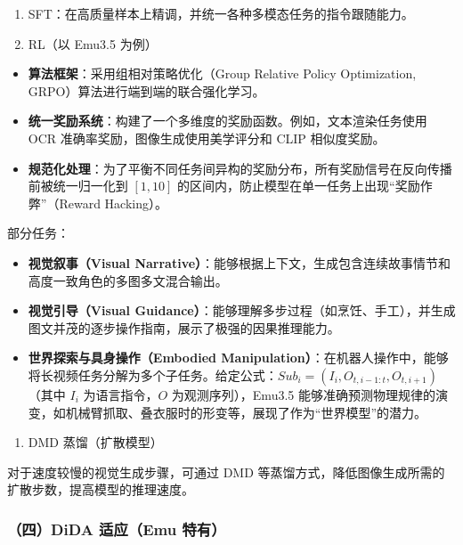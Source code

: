 \begin{enumerate}
\def\labelenumi{\arabic{enumi}.}
\item
  SFT：在高质量样本上精调，并统一各种多模态任务的指令跟随能力。
\item
  RL（以 Emu3.5 为例）
\end{enumerate}

\begin{itemize}
\tightlist
\item
  \textbf{算法框架}：采用组相对策略优化（Group Relative Policy Optimization, GRPO）算法进行端到端的联合强化学习。
\item
  \textbf{统一奖励系统}：构建了一个多维度的奖励函数。例如，文本渲染任务使用 OCR 准确率奖励，图像生成使用美学评分和 CLIP 相似度奖励。
\item
  \textbf{规范化处理}：为了平衡不同任务间异构的奖励分布，所有奖励信号在反向传播前被统一归一化到 \([1,10]\) 的区间内，防止模型在单一任务上出现``奖励作弊''（Reward Hacking）。
\end{itemize}

部分任务：

\begin{itemize}
\tightlist
\item
  \textbf{视觉叙事（Visual Narrative）}：能够根据上下文，生成包含连续故事情节和高度一致角色的多图多文混合输出。
\item
  \textbf{视觉引导（Visual Guidance）}：能够理解多步过程（如烹饪、手工），并生成图文并茂的逐步操作指南，展示了极强的因果推理能力。
\item
  \textbf{世界探索与具身操作（Embodied Manipulation）}：在机器人操作中，能够将长视频任务分解为多个子任务。给定公式：\(Sub_i=(I_i,O_{t,i-1:t},O_{t,i+1})\)（其中 \(I_i\) 为语言指令，\(O\) 为观测序列），Emu3.5 能够准确预测物理规律的演变，如机械臂抓取、叠衣服时的形变等，展现了作为``世界模型''的潜力。
\end{itemize}

\begin{enumerate}
\def\labelenumi{\arabic{enumi}.}
\setcounter{enumi}{2}
\tightlist
\item
  DMD 蒸馏（扩散模型）
\end{enumerate}

对于速度较慢的视觉生成步骤，可通过 DMD 等蒸馏方式，降低图像生成所需的扩散步数，提高模型的推理速度。

\hypertarget{ux56dbdida-ux9002ux5e94emu-ux7279ux6709}{%
\subsubsection{（四）DiDA 适应（Emu 特有）}\label{ux56dbdida-ux9002ux5e94emu-ux7279ux6709}}

